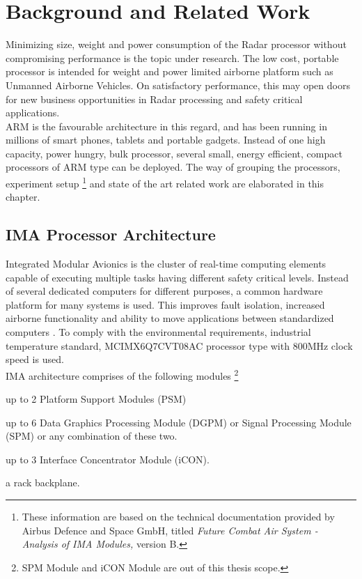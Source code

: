 \chapter{Background and Related Work}
\label{chap:bg_related_work}
Minimizing size, weight and power consumption of the Radar processor without compromising performance is the topic under research. The low cost, portable processor is intended for weight and power limited airborne platform such as Unmanned Airborne Vehicles. On satisfactory performance, this may open doors for new business opportunities in Radar processing and safety critical applications. \\
ARM is the favourable architecture in this regard, and has been running in millions of smart phones, tablets and portable gadgets. Instead of one high capacity, power hungry, bulk processor, several small, energy efficient, compact processors of ARM type can be deployed. The way of grouping the processors, experiment setup \footnote{These information are based on the technical documentation provided by Airbus Defence and Space GmbH, titled \textsl{Future Combat Air System - Analysis of IMA Modules,} version B.} and state of the art related work are elaborated in this chapter.

\section{IMA Processor Architecture} 
\label{sec:bg_related_work:ima}
Integrated Modular Avionics is the cluster of real-time computing elements capable of executing multiple tasks having different safety critical levels. Instead of several dedicated computers for different purposes, a common hardware platform for many systems is used. This improves fault isolation, increased airborne functionality and ability to move applications between standardized computers \cite{theAvionics}. To comply with the environmental requirements, industrial temperature standard, MCIMX6Q7CVT08AC processor type with 800MHz clock speed is used. \\

IMA architecture comprises of the following modules \footnote{SPM Module and iCON Module are out of this thesis scope.}
\begin{compactitem} 
	\item up to 2 Platform Support Modules (PSM) 
	\item up to 6 Data Graphics Processing Module (DGPM) or Signal Processing Module (SPM) or any combination of these two.
	\item up to 3 Interface Concentrator Module (iCON).
	\item a rack backplane.
\end{compactitem}

